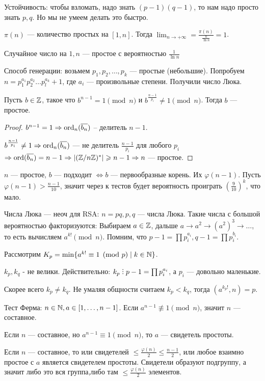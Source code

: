 Устойчивость: чтобы взломать, надо знать $(p-1)(q-1)$, то нам надо просто знать $p, q$. Но мы не умеем делать это быстро.
 \begin{theorem}
     $\pi(n)$ --- количество простых на  $[1, n]$. Тогда  $\lim_{n \to +\infty} = \frac{\pi(n)}{\frac{n}{\ln n}} = 1$.
\end{theorem}
\begin{consequence}
   Случайное число на $1, n$ --- простое с вероятностью  $\frac{1}{\ln n}$ 
\end{consequence}

Способ генерации: возьмем $p_1, p_2,\ldots,p_k$ --- простые (небольшие). Попробуем $n = p_1^{a_1}p_2^{a_2}\ldots p_l^{a_k} + 1$, где $a_i$ --- произвольные степени. Получили число Люка.

\begin{theorem}
Пусть  $b \in \mathbb{Z}$, такое что  $b^{n-1}= 1 \pmod{n}$ и  $b^{\frac{n-1}{p_i}} \neq 1 \pmod{n}$. Тогда $b$ --- простое.
\end{theorem}
\begin{proof}
    $b^{n-1} = 1 \Rightarrow \operatorname{ord}_n(\overline{b_n})$ -- делитель  $n - 1$.

    $b^{\frac{n-1}{p_i}} \neq 1 \Rightarrow \operatorname{ord}_n(\overline{b_n})$ --- не делитель $\frac{n-1}{p_i}$ для любого $p_i$  $\Rightarrow \operatorname{ord}(\overline{b_n}) = n-1 \Rightarrow |(\mathbb{Z} / n\mathbb{Z})^*| \geqslant n-1 \Rightarrow n$ --- простое.
\end{proof}
\begin{remark}
    $n$ --- простое,  $b$ --- подходит  $\iff b$ --- первообразные корень. Их $\varphi(n-1)$. Пусть $\varphi(n-1) > \frac{n - 1}{10}$, значит через к тестов будет вероятность проиграть $\left(\frac{9}{10}\right)^k$, что мало.
\end{remark}
\begin{remark}
    Числа Люка --- неоч для RSA: $n=pq, p, q$ --- числа Люка. Такие числа с большой вероятностью факторизуются: Выбираем  $a \in \mathbb{Z}$, дальше  $a\to a^2 \to (a^2)^3 \to \ldots$, то есть вычисляем $a^{k!} \pmod{n}$. Помним, что  $p - 1 = \prod p_i^{a_i}, q - 1 = \prod p_i^{b_i}$. 

    Рассмотрим  $K_p = \min \{a^{k!} \equiv 1 \pmod p  \mid k \in \mathbb{N} \}$.  

    $k_p, k_q$ - не велики. Действительно:  $k_p \divby p - 1 = \prod p_i^{a_i}$, а $p_i$ --- довольно маленькие.
    
    Скорее всего $k_p \neq k_q$. Не умаляя общности считаем  $k_p < k_q$, тогда  $(a^{k_p!}, n) = p$. 
\end{remark}
\slashn
Тест Ферма: $n \in \mathbb{N}, a \in [1,\ldots,n-1]$. Если $a^{n-1} \not \equiv 1 \pmod{n}$, значит  $n$ --- составное. 
 \begin{definition}
     Если $n$ --- составное, но  $a^{n-1} \equiv 1 \pmod{n}$, то  $a$ --- свидетель простоты.
\end{definition}
\slashn
Если $n$ --- составное, то или свидетелей  $\le \frac{\varphi(n)}{2} \le \frac{n-1}{2}$, или любое взаимно простое с $a$ является свидетелем простоты. Свидетели образуют подгруппу, а значит либо это вся группа,либо там $\le \frac{\varphi(n)}{2}$ элементов. 

